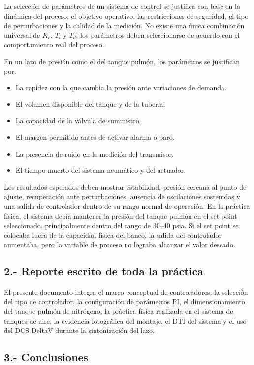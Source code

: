 \documentclass[12pt,letterpaper]{article}
\begin{document}
La selección de parámetros de un sistema de control se justifica con base en la dinámica del proceso, el objetivo operativo, las restricciones de seguridad, el tipo de perturbaciones y la calidad de la medición. No existe una única combinación universal de $K_c$, $T_i$ y $T_d$; los parámetros deben seleccionarse de acuerdo con el comportamiento real del proceso.

En un lazo de presión como el del tanque pulmón, los parámetros se justifican por:

\begin{itemize}[itemsep=0.3em]
    \item La rapidez con la que cambia la presión ante variaciones de demanda.
    \item El volumen disponible del tanque y de la tubería.
    \item La capacidad de la válvula de suministro.
    \item El margen permitido antes de activar alarma o paro.
    \item La presencia de ruido en la medición del transmisor.
    \item El tiempo muerto del sistema neumático y del actuador.
\end{itemize}

Los resultados esperados deben mostrar estabilidad, presión cercana al punto de ajuste, recuperación ante perturbaciones, ausencia de oscilaciones sostenidas y una salida de controlador dentro de su rango normal de operación. En la práctica física, el sistema debía mantener la presión del tanque pulmón en el set point seleccionado, principalmente dentro del rango de 30--40 psia. Si el set point se colocaba fuera de la capacidad física del banco, la salida del controlador aumentaba, pero la variable de proceso no lograba alcanzar el valor deseado.

\subsection*{2.- Reporte escrito de toda la práctica}

El presente documento integra el marco conceptual de controladores, la selección del tipo de controlador, la configuración de parámetros PI, el dimensionamiento del tanque pulmón de nitrógeno, la práctica física realizada en el sistema de tanques de aire, la evidencia fotográfica del montaje, el DTI del sistema y el uso del DCS DeltaV durante la sintonización del lazo.

\subsection*{3.- Conclusiones}
\end{document}
